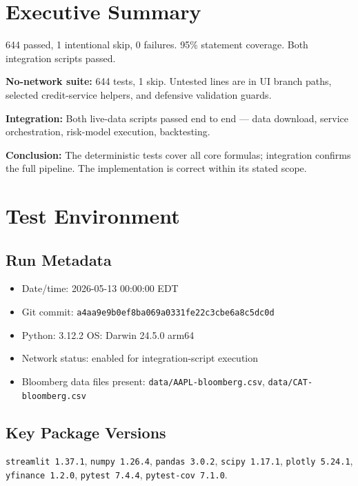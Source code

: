 \documentclass[11pt]{article}
\newcommand{\code}[1]{\texttt{#1}}
\begin{document}
\tableofcontents
\clearpage

\section{Executive Summary}

644 passed, 1 intentional skip, 0 failures.  95\% statement coverage.
Both integration scripts passed.

\textbf{No-network suite:} 644 tests, 1 skip.  Untested lines are in UI
branch paths, selected credit-service helpers, and defensive validation
guards.

\textbf{Integration:} Both live-data scripts passed end to end --- data
download, service orchestration, risk-model execution, backtesting.

\textbf{Conclusion:} The deterministic tests cover all core formulas;
integration confirms the full pipeline.  The implementation is correct
within its stated scope.

\section{Test Environment}

\subsection{Run Metadata}

\begin{itemize}
  \item Date/time: 2026-05-13 00:00:00 EDT
  \item Git commit: \code{a4aa9e9b0ef8ba069a0331fe22c3cbe6a8c5dc0d}
  \item Python: 3.12.2 \quad OS: Darwin 24.5.0 arm64
  \item Network status: enabled for integration-script execution
  \item Bloomberg data files present: \code{data/AAPL-bloomberg.csv},
    \code{data/CAT-bloomberg.csv}
\end{itemize}

\subsection{Key Package Versions}

{\footnotesize \code{streamlit 1.37.1}, \code{numpy 1.26.4},
\code{pandas 3.0.2}, \code{scipy 1.17.1},
\code{plotly 5.24.1}, \code{yfinance 1.2.0},
\code{pytest 7.4.4}, \code{pytest-cov 7.1.0}.}
\end{document}
